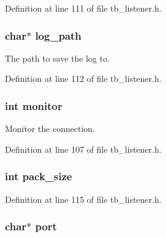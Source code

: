 Definition at line 111 of file tb\-\_\-listener.\-h.

\hypertarget{structtb__test__params__t_ac0ddb52991004ce37e7ef093186f44a1}{
\subsubsection[{log\-\_\-path}]{\setlength{\rightskip}{0pt plus 5cm}char$\ast$ log\-\_\-path}}\label{structtb__test__params__t_ac0ddb52991004ce37e7ef093186f44a1}


The path to save the log to. 



Definition at line 112 of file tb\-\_\-listener.\-h.

\hypertarget{structtb__test__params__t_a46fa1969de5714507943035793d36269}{
\subsubsection[{monitor}]{\setlength{\rightskip}{0pt plus 5cm}int monitor}}\label{structtb__test__params__t_a46fa1969de5714507943035793d36269}


Monitor the connection. 



Definition at line 107 of file tb\-\_\-listener.\-h.

\hypertarget{structtb__test__params__t_af7112fe07fe05134febc994e10196ce5}{
\subsubsection[{pack\-\_\-size}]{\setlength{\rightskip}{0pt plus 5cm}int pack\-\_\-size}}\label{structtb__test__params__t_af7112fe07fe05134febc994e10196ce5}


Definition at line 115 of file tb\-\_\-listener.\-h.

\hypertarget{structtb__test__params__t_add99ba4ea70b8f66170823cad9a55fa4}{
\subsubsection[{port}]{\setlength{\rightskip}{0pt plus 5cm}char$\ast$ port}}\label{structtb__test__params__t_add99ba4ea70b8f66170823cad9a55fa4}



